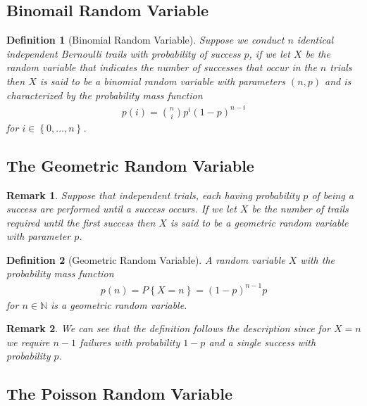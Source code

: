 \documentclass[11pt, oneside]{book}   	%
\newtheorem{definition}{Definition}[chapter]
\newtheorem{remark}{Remark}[chapter]
\begin{document}
\begin{spacing}{1.618}
\subsection{Binomail Random Variable}
\begin{definition}[Binomial Random Variable]
	Suppose we conduct $n$ identical independent Bernoulli trails with probability of success $p$, if we let $X$ be the random variable that indicates the number of successes that occur in the $n$ trials then $X$ is said to be a binomial random variable with parameters $(n, p)$ and is characterized by the probability mass function
	\begin{alignat}{4}
		p(i)=\binom{n}{i}p^i(1-p)^{n-i}
	\end{alignat}
	for $i\in \left\{0, \dots, n\right\}$. 
\end{definition}

\subsection{The Geometric Random Variable}

\begin{remark}
	Suppose that independent trials, each having probability $p$ of being a success are performed until a success occurs. If we let $X$ be the number of trails required until the first success then $X$ is said to be a geometric random variable with parameter $p$. 
\end{remark}

\begin{definition}[Geometric Random Variable]
	A random variable $X$ with the probability mass function
	\begin{alignat}{4}
		p(n)=P\left\{X=n\right\} = (1-p)^{n-1}p
	\end{alignat}
	for $n\in\mathbb{N}$ is a geometric random variable. 
\end{definition}

\begin{remark}
	We can see that the definition follows the description since for $X=n$ we require $n-1$ failures with probability $1-p$ and a single success with probability $p$. 
\end{remark}

\subsection{The Poisson Random Variable}


\end{spacing}
\end{document}
